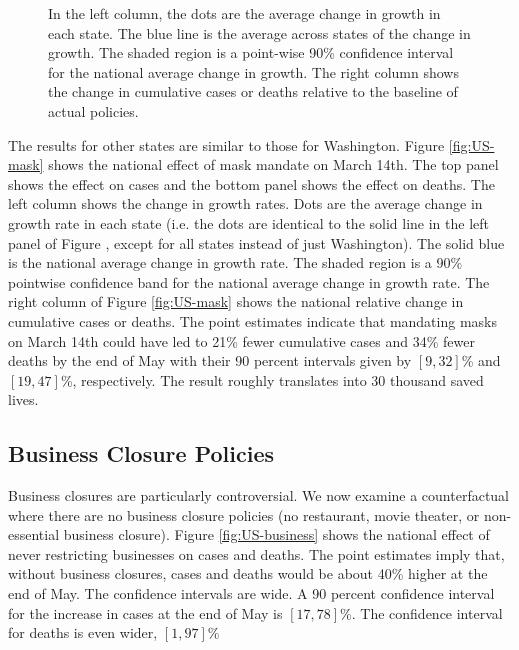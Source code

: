 \documentclass[11pt,reqno,letter]{amsart}
\theoremstyle{definition}
\begin{document}
\begin{figure}[ht]
\begin{minipage}{\linewidth}
    \begin{flushleft}
      \footnotesize In the left column, the dots are the average
      change in growth in each state. The blue line is the average
      across states of the change in growth. The shaded region is a
      point-wise 90\% confidence interval for the national average
      change in growth. The right column shows the change in
      cumulative cases or deaths relative to the baseline of actual policies.
    \end{flushleft}
  \end{minipage}
\end{figure}


The results for other states are similar to those for Washington.
Figure \ref{fig:US-mask} shows the national effect of mask mandate on
March 14th. The top panel shows the effect on cases and the bottom
panel shows the effect on deaths. The left column shows the change in
growth rates. Dots are the average change in growth rate in each state
(i.e. the dots are identical to the solid line in the left panel of
Figure \label{fig:WA-mask}, except for all states instead of just
Washington). The solid blue is the national average change in growth
rate. The shaded region is a 90\% pointwise confidence band for the
national average change in growth rate. The right column of Figure
\ref{fig:US-mask} shows the national relative change in cumulative cases
or deaths. The point estimates indicate that mandating masks on March
14th could have led to 21\% fewer cumulative cases and 34\% fewer
deaths by the end of May with their 90 percent intervals
given by $[9,32]$\% and $[19,47]$\%, respectively.
The result roughly translates into $30$ thousand saved lives.

\subsection{Business Closure Policies}

Business closures are particularly controversial. We now examine a
counterfactual where there are no business closure policies (no
restaurant, movie theater, or non-essential business closure).  Figure
\ref{fig:US-business} shows the national effect of never restricting
businesses on cases and deaths. The point estimates imply that,
without business closures, cases and deaths would be about 40\% higher
at the end of May. The confidence intervals are wide. A 90 percent
confidence interval for the increase in cases at the end of May is
$[17,78]$\%.
The confidence interval for deaths is even wider, $[1, 97]$\%
\end{document}
